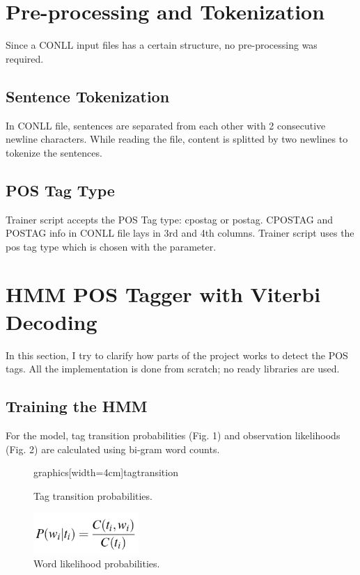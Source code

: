 \documentclass[twocolumn,preprintnumbers,amsmath,amssymb,superscriptaddress,pre]{revtex4}
\theoremstyle{plain}%
\theoremstyle{definition}
\theoremstyle{remark}
\begin{document}

\section{Pre-processing and Tokenization}
Since a CONLL input files has a certain structure, no pre-processing was required.
\subsection{Sentence Tokenization}
In CONLL file, sentences are separated from each other with 2 consecutive newline characters. While reading
the file, content is splitted by two newlines to tokenize the sentences.
\subsection{POS Tag Type}
Trainer script accepts the POS Tag type: cpostag or postag. CPOSTAG and POSTAG info in CONLL file lays in
3rd and 4th columns. Trainer script uses the pos tag type which is chosen with the parameter.


 
 \section{HMM POS Tagger with Viterbi Decoding}
In this section, I try to clarify how parts of the project works to detect the POS tags. All the implementation 
 is done from scratch; no ready libraries are used. 
 \subsection{Training the HMM}
 For the model, tag transition probabilities (Fig. 1) and observation likelihoods (Fig. 2) are calculated using bi-gram word counts.
 \begin{figure}[h]
\caption{Tag transition probabilities.}
\centering

graphics[width=4cm]{tagtransition}
\end{figure}

 \begin{figure}[h]
\caption{Word likelihood probabilities.}
\centering
\includegraphics[width=4cm]{wordlikelihood}
\end{figure}
\end{document}
